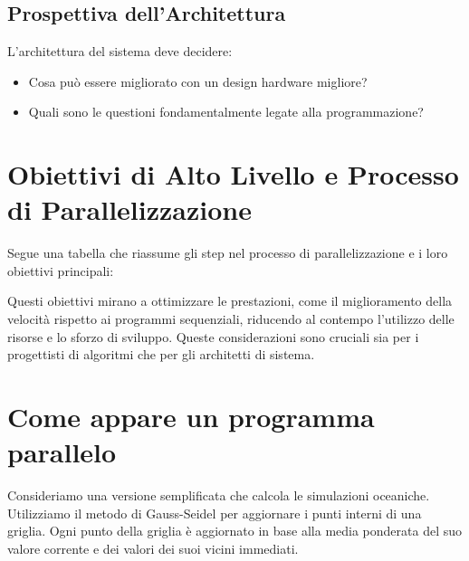 \subsection*{Prospettiva dell'Architettura}
L'architettura del sistema deve decidere:
\begin{itemize}
    \item Cosa può essere migliorato con un design
    hardware migliore?
    \item Quali sono le questioni fondamentalmente
    legate alla programmazione?
\end{itemize}

\section{Obiettivi di Alto Livello e Processo di
Parallelizzazione}
Segue una tabella che riassume gli step nel processo
di parallelizzazione e i loro obiettivi principali:

\noindent{}

Questi obiettivi mirano a ottimizzare le prestazioni,
come il miglioramento della velocità rispetto ai programmi
sequenziali, riducendo al contempo l'utilizzo delle
risorse e lo sforzo di sviluppo. Queste considerazioni
sono cruciali sia per i progettisti di algoritmi che
per gli architetti di sistema.

\section{Come appare un programma parallelo}

Consideriamo una versione semplificata che calcola
le simulazioni oceaniche. Utilizziamo il metodo di
Gauss-Seidel per aggiornare i punti interni di una
griglia. Ogni punto della griglia è aggiornato
in base alla media ponderata del suo valore corrente
e dei valori dei suoi vicini immediati.

